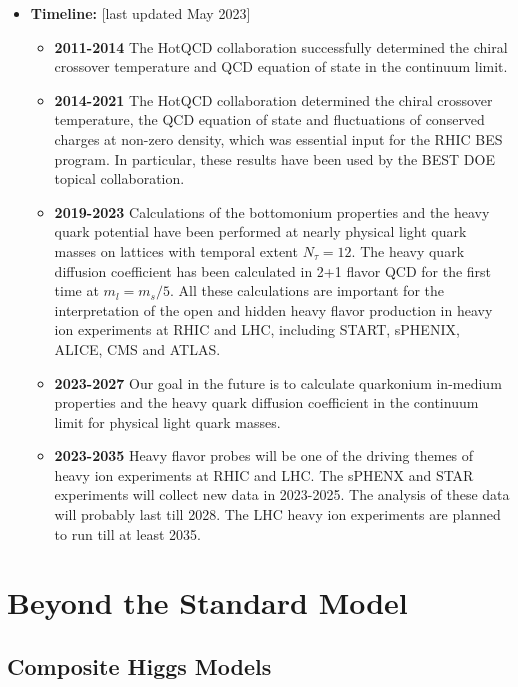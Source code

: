 \documentclass[12pt,hyperpdf]{article}
\begin{document}
\begin{itemize}
 \item{\bf Timeline:} \hfill [last updated May 2023]
\begin{itemize}
   \item{\bf 2011-2014} The HotQCD collaboration successfully determined
     the chiral crossover temperature and QCD equation of state in the
     continuum limit. 
   \item{\bf 2014-2021} The HotQCD collaboration determined the chiral
     crossover temperature, the QCD equation of state and fluctuations
     of conserved charges at non-zero density, which was essential
     input for the RHIC BES program. In particular, these results have
     been used by the BEST DOE topical collaboration.
   \item{\bf 2019-2023} Calculations of the bottomonium properties and the
     heavy quark potential have been performed at nearly physical
     light quark masses on lattices with temporal extent
     $N_{\tau}=12$. The heavy quark diffusion coefficient has been
     calculated in 2+1 flavor QCD for the first time at
     $m_l=m_s/5$. All these calculations are important for the
     interpretation of the open and hidden heavy flavor production in
     heavy ion experiments at RHIC and LHC, including START, sPHENIX,
     ALICE, CMS and ATLAS.
   \item{\bf 2023-2027} Our goal in the future is to calculate quarkonium
     in-medium properties and the heavy quark diffusion coefficient in
     the continuum limit for physical light quark masses.
   \item{\bf 2023-2035} Heavy flavor probes will be one of the driving
     themes of heavy ion experiments at RHIC and LHC. The sPHENX and
     STAR experiments will collect new data in 2023-2025. The analysis
     of these data will probably last till 2028. The LHC heavy ion
     experiments are planned to run till at least 2035. 
\end{itemize}
\end{itemize}


\section{Beyond the Standard Model}\label{sec:BSM}

\subsection{Composite Higgs Models}
\end{document}
